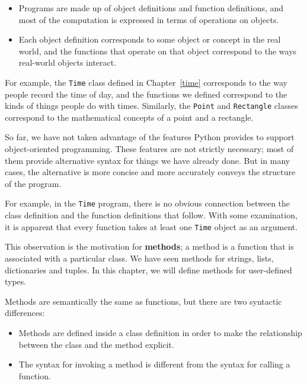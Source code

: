 \documentclass[10pt]{book}
\begin{document}
\begin{CJK}{UTF8}{gbsn}
\begin{itemize}

\item Programs are made up of object definitions and function
definitions, and most of the computation is expressed in terms
of operations on objects.

\item Each object definition corresponds to some object or concept
in the real world, and the functions that operate on that object
correspond to the ways real-world objects interact.

\end{itemize}

For example, the {\tt Time} class defined in Chapter~\ref{time}
corresponds to the way people record the time of day, and the
functions we defined correspond to the kinds of things people do with
times.  Similarly, the {\tt Point} and {\tt Rectangle} classes
correspond to the mathematical concepts of a point and a rectangle.

So far, we have not taken advantage of the features Python provides to
support object-oriented programming.  These
features are not strictly necessary; most of them provide
alternative syntax for things we have already done.  But in many cases,
the alternative is more concise and more accurately conveys the
structure of the program.

For example, in the {\tt Time} program, there is no obvious
connection between the class definition and the function definitions
that follow.  With some examination, it is apparent that every function
takes at least one {\tt Time} object as an argument.

This observation is the motivation for {\bf methods}; a method is
a function that is associated with a particular class.
We have seen methods for strings, lists, dictionaries and tuples.
In this chapter, we will define methods for user-defined types.

Methods are semantically the same as functions, but there are
two syntactic differences:

\begin{itemize}

\item Methods are defined inside a class definition in order
to make the relationship between the class and the method explicit.

\item The syntax for invoking a method is different from the
syntax for calling a function.


\end{itemize}
\end{CJK}
\end{document}
